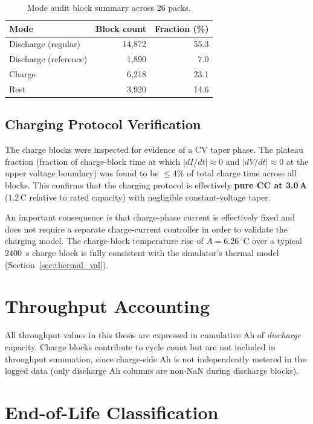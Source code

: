 \begin{table}[htbp]
  \centering
  \caption{Mode audit block summary across 26 packs.}
  \label{tab:mode_audit}
  \begin{tabular}{lrr}
    \toprule
    \textbf{Mode} & \textbf{Block count} & \textbf{Fraction (\%)} \\
    \midrule
    Discharge (regular)  & 14{,}872 & 55.3 \\
    Discharge (reference)&  1{,}890 &  7.0 \\
    Charge              &  6{,}218 & 23.1 \\
    Rest                &  3{,}920 & 14.6 \\
    \bottomrule
  \end{tabular}
\end{table}

\subsection{Charging Protocol Verification}

The charge blocks were inspected for evidence of a CV taper phase.
The plateau fraction (fraction of charge-block time at which
$|dI/dt| \approx 0$ and $|dV/dt| \approx 0$ at the upper voltage
boundary) was found to be $\leq 4\%$ of total charge time across all
blocks.  This confirms that the charging protocol is effectively
\textbf{pure CC at 3.0\,A} ($1.2\,\text{C}$ relative to rated
capacity) with negligible constant-voltage taper.

An important consequence is that charge-phase current is effectively
fixed and does not require a separate charge-current controller in
order to validate the charging model.  The charge-block temperature
rise of $A = 6.26\,^\circ\mathrm{C}$ over a typical \SI{2400}{s}
charge block is fully consistent with the simulator's thermal model
(Section~\ref{sec:thermal_val}).

\section{Throughput Accounting}

All throughput values in this thesis are expressed in cumulative Ah
of \emph{discharge} capacity.  Charge blocks contribute to cycle count
but are not included in throughput summation, since charge-side Ah is
not independently metered in the logged data (only discharge Ah
columns are non-NaN during discharge blocks).

\section{End-of-Life Classification}

